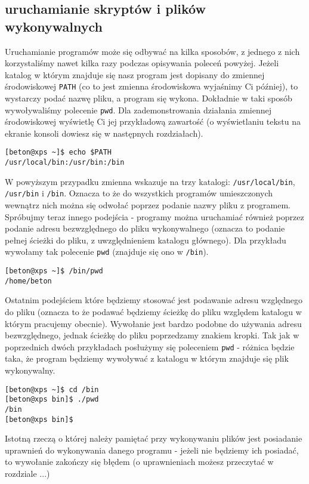 \subsection{uruchamianie skryptów i plików wykonywalnych}
Uruchamianie programów może się odbywać na kilka sposobów, z jednego z nich korzystaliśmy nawet kilka razy podczas opisywania poleceń powyżej. Jeżeli katalog w którym znajduje się nasz program jest dopisany do zmiennej środowiskowej \texttt{PATH} (co to jest zmienna środowiskowa wyjaśnimy Ci później), to wystarczy podać nazwę pliku, a program się wykona. Dokładnie w taki sposób wywoływaliśmy polecenie \texttt{pwd}. Dla zademonstrowania działania zmiennej środowiskowej wyświetlę Ci jej przykładową zawartość (o wyświetlaniu tekstu na ekranie konsoli dowiesz się w następnych rozdziałach).
\begin{verbatim}
[beton@xps ~]$ echo $PATH
/usr/local/bin:/usr/bin:/bin
\end{verbatim}
W powyższym przypadku zmienna wskazuje na trzy katalogi: \texttt{/usr/local/bin}, \texttt{/usr/bin} i \texttt{/bin}. Oznacza to że do wszystkich programów umieszczonych wewnątrz nich można się odwołać poprzez podanie nazwy pliku z programem.
\newline
Spróbujmy teraz innego podejścia - programy można uruchamiać również poprzez podanie adresu bezwzględnego do pliku wykonywalnego (oznacza to podanie pełnej ścieżki do pliku, z uwzględnieniem katalogu głównego). Dla przykładu wywołamy tak polecenie \texttt{pwd} (znajduje się ono w \texttt{/bin}).
\begin{verbatim}
[beton@xps ~]$ /bin/pwd
/home/beton
\end{verbatim}
Ostatnim podejściem które będziemy stosować jest podawanie adresu względnego do pliku (oznacza to że podawać będziemy ścieżkę do pliku względem katalogu w którym pracujemy obecnie). Wywołanie jest bardzo podobne do używania adresu bezwzględnego, jednak ścieżkę do pliku poprzedzamy znakiem kropki. Tak jak w poprzednich dwóch przykładach posłużymy się poleceniem \texttt{pwd} - różnica będzie taka, że program będziemy wywoływać z katalogu w którym znajduje się plik wykonywalny.
\begin{verbatim}
[beton@xps ~]$ cd /bin
[beton@xps bin]$ ./pwd 
/bin
[beton@xps bin]$ 
\end{verbatim}
Istotną rzeczą o której należy pamiętać przy wykonywaniu plików jest posiadanie uprawnień do wykonywania danego programu - jeżeli nie będziemy ich posiadać, to wywołanie zakończy się błędem (o uprawnieniach możesz przeczytać w rozdziale ...) %
